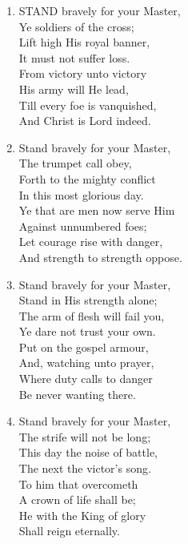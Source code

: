 \begin{enumerate}
    \item STAND bravely for your Master, \\
        Ye soldiers of the cross; \\
        Lift high His royal banner, \\
        It must not suffer loss. \\
        From victory unto victory \\
        His army will He lead, \\
        Till every foe is vanquished, \\
        And Christ is Lord indeed.

    \item Stand bravely for your Master, \\
        The trumpet call obey, \\
        Forth to the mighty conflict \\
        In this most glorious day. \\
        Ye that are men now serve Him \\
        Against unnumbered foes; \\
        Let courage rise with danger, \\
        And strength to strength oppose.

    \item Stand bravely for your Master, \\
        Stand in His strength alone; \\
        The arm of flesh will fail you, \\
        Ye dare not trust your own. \\
        Put on the gospel armour, \\
        And, watching unto prayer, \\
        Where duty calls to danger \\
        Be never wanting there.

    \item Stand bravely for your Master, \\
        The strife will not be long; \\
        This day the noise of battle, \\
        The next the victor's song. \\
        To him that overcometh \\
        A crown of life shall be; \\
        He with the King of glory \\
        Shall reign eternally.

\end{enumerate}

